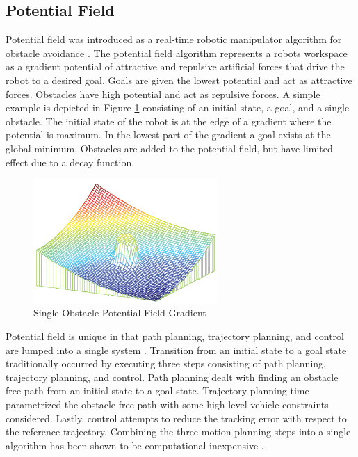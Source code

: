 \documentclass[numbered,pdftex]{ohio-etd}
\begin{document}

\subsection{Potential Field}

Potential field was introduced as a real-time robotic manipulator algorithm for obstacle avoidance \cite{khatib_real-time_1986}. The potential field algorithm represents a robots workspace as a gradient potential of attractive and repulsive artificial forces that drive the robot to a desired goal. Goals are given the lowest potential and act as attractive forces. Obstacles have high potential and act as repulsive forces. A simple example is depicted in Figure \ref{fig:pfobstacle} consisting of an initial state, a goal, and a single obstacle. The initial state of the robot is at the edge of a gradient where the potential is maximum. In the lowest part of the gradient a goal exists at the global minimum. Obstacles are added to the potential field, but have limited effect due to a decay function.

\begin{figure}[h!]
	\centering
	\includegraphics[width=7cm]{PaperFigures/pfObstacle}
	\caption{Single Obstacle Potential Field Gradient \cite{liu_virtual-waypoint_2016}}
	\label{fig:pfobstacle}
\end{figure}

Potential field is unique in that path planning, trajectory planning, and control are lumped into a single system \cite{rimon_exact_1992}. Transition from an initial state to a goal state traditionally occurred by executing three steps consisting of path planning, trajectory planning, and control. Path planning dealt with finding an obstacle free path from an initial state to a goal state. Trajectory planning time parametrized the obstacle free path with some high level vehicle constraints considered. Lastly, control attempts to reduce the tracking error with respect to the reference trajectory. Combining the three motion planning steps into a single algorithm has been shown to be computational inexpensive \cite{goerzen_survey_2010}. 
\end{document}
